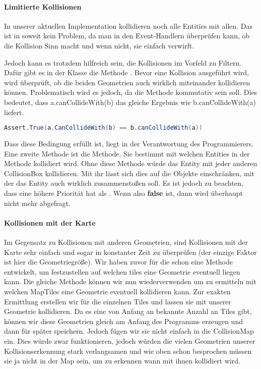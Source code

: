 \paragraph{Limitierte Kollisionen}

In unserer aktuellen Implementation kollidieren noch alle Entities mit allen. Das ist in soweit kein Problem, da man in den Event-Handlern überprüfen kann, ob die Kollision Sinn macht und wenn nicht, sie einfach verwirft.

Jedoch kann es trotzdem hilfreich sein, die Kollisionen im Vorfeld zu Filtern. Dafür gibt es in der Klasse  die Methode . Bevor eine Kollision ausgeführt wird, wird überprüft, ob die beiden Geometrien auch wirklich miteinander kollidieren können. 
Problematisch wird es jedoch, da die Methode kommutativ sein soll.
Dies bedeutet, dass a.canCollideWith(b) das gleiche Ergebnis wie b.canCollideWith(a) liefert. 

\doinline
\begin{lstlisting}[caption=Kommutative Eigenschaft von canCollideWith, title=\hspace{0 pt}, language=java]
Assert.True(a.CanCollideWith(b) == b.canCollideWith(a))
\end{lstlisting}

Dass diese Bedingung erfüllt ist, liegt in der Verantwortung des Programmierers. Eine zweite Methode ist die  Methode. Sie bestimmt mit welchen Entities in der  Methode kollidiert wird. Ohne diese Methode würde das Entity mit jeder anderen CollisionBox kollidieren. Mit ihr lässt sich dies auf die Objekte einschränken, mit der das Entity auch wirklich zusammenstoßen soll. Es ist jedoch zu beachten, dass  eine höhere Priorität hat als . Wenn also  \textbf{false} ist, dann wird  überhaupt nicht mehr abgefragt.

\paragraph{Kollisionen mit der Karte}

Im Gegensatz zu Kollisionen mit anderen Geometrien, sind Kollisionen mit der Karte sehr einfach und sogar in konstanter Zeit zu überprüfen (der einzige Faktor ist hier die Geometriegröße).
Wir haben zuvor für die  schon eine Methode entwickelt, um festzustellen auf welchen tiles eine Geometrie eventuell liegen kann.
Die gleiche Methode können wir nun wiederverwenden um zu ermitteln mit welchen MapTiles eine Geometrie eventuell kollidieren kann. Zur exakten Ermittlung erstellen wir  für die einzelnen Tiles und lassen sie mit unserer Geometrie kollidieren. Da es eine von Anfang an bekannte Anzahl an Tiles gibt, können wir diese Geometrien gleich am Anfang des Programms erzeugen und dann für später speichern. 
Jedoch fügen wir sie nicht einfach in die CollisionMap ein. Dies würde zwar funktionieren, jedoch würden die vielen Geometrien unserer Kollisionserkennung stark verlangsamen und wie oben schon besprochen müssen sie ja nicht in der Map sein, um zu erkennen wann mit ihnen kollidiert wird.

